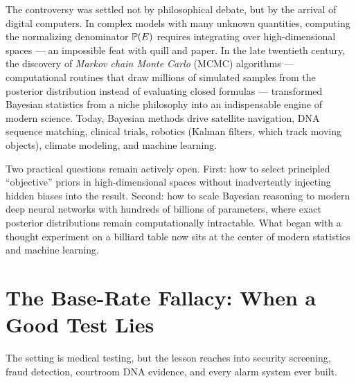 \begin{historybox}
The controversy was settled not by philosophical debate, but by the arrival of digital
computers. In complex models with many unknown quantities, computing the normalizing
denominator $\P(E)$ requires integrating over high-dimensional spaces --- an impossible
feat with quill and paper. In the late twentieth century, the discovery of \emph{Markov
chain Monte Carlo} (MCMC) algorithms --- computational routines that draw millions of
simulated samples from the posterior distribution instead of evaluating closed formulas
--- transformed Bayesian statistics from a niche philosophy into an indispensable engine
of modern science. Today, Bayesian methods drive satellite navigation, DNA sequence
matching, clinical trials, robotics (Kalman filters, which track moving objects), climate modeling, and machine
learning.

Two practical questions remain actively open. First: how to select principled
``objective'' priors in high-dimensional spaces without inadvertently injecting hidden
biases into the result. Second: how to scale Bayesian reasoning to modern deep neural
networks with hundreds of billions of parameters, where exact posterior distributions
remain computationally intractable. What began with a thought experiment on a billiard
table now sits at the center of modern statistics and machine learning.
\end{historybox}

\section{The Base-Rate Fallacy: When a Good Test Lies}
\label{ch05:base-rate}

The setting is medical testing, but the lesson reaches into security screening,
fraud detection, courtroom DNA evidence, and every alarm system ever built.

